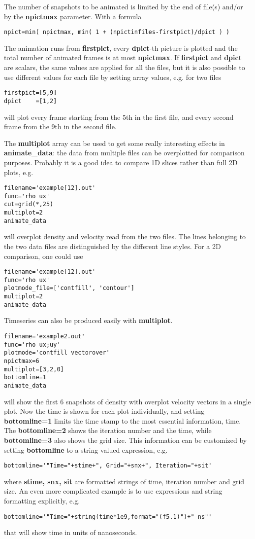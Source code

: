 \documentclass{article}
\begin{document}
   The number of snapshots to be animated is limited by the end of 
   file(s) and/or by the {\bf npictmax} parameter. With a formula
\begin{verbatim}
npict=min( npictmax, min( 1 + (npictinfiles-firstpict)/dpict ) )
\end{verbatim}
   The animation runs from {\bf firstpict}, every {\bf dpict}-th picture is
   plotted and the total number of animated frames is at most {\bf npictmax}. 
   If {\bf firstpict} and {\bf dpict} are scalars, the same values are
   applied for all the files, but it is also possible to use different
   values for each file by setting array values, e.g. for two files
\begin{verbatim}
firstpict=[5,9]
dpict    =[1,2]
\end{verbatim}
   will plot every frame starting from the 5th in the first file,
   and every second frame from the 9th in the second file.

   The {\bf multiplot} array can be used to get some really interesting
   effects in {\bf animate\_data}: 
   the data from multiple files can be overplotted for comparison purposes.
   Probably it is a good idea to compare 1D slices rather than full 2D plots,
   e.g. 
\begin{verbatim}
filename='example[12].out'
func='rho ux'
cut=grid(*,25)
multiplot=2
animate_data
\end{verbatim}
   will overplot density and velocity read from the two files. 
   The lines belonging to the two data files are distinguished by
   the different line styles. For a 2D comparison, one could use
\begin{verbatim}
filename='example[12].out'
func='rho ux'
plotmode_file=['contfill', 'contour']
multiplot=2
animate_data
\end{verbatim}
   Timeseries can also be produced easily with {\bf multiplot}. 
\begin{verbatim}
filename='example2.out'
func='rho ux;uy'
plotmode='contfill vectorover'
npictmax=6
multiplot=[3,2,0]
bottomline=1
animate_data
\end{verbatim}
   will show the first 6 snapshots of density with overplot velocity vectors
   in a single plot. 
   Now the time is shown for each plot individually, and setting
   {\bf bottomline=1} limits the time stamp to the most essential
   information, time. The {\bf bottomline=2} shows the iteration number
   and the time, while {\bf bottomline=3} also shows the grid size.
   This information can be customized by setting {\bf bottomline} to
   a string valued expression, e.g.
\begin{verbatim}
bottomline='"Time="+stime+", Grid="+snx+", Iteration="+sit'
\end{verbatim}
where {\bf stime, snx, sit} are formatted strings of time, iteration number
and grid size. An even more complicated example is to use expressions and
string formatting explicitly, e.g.
\begin{verbatim}
bottomline='"Time="+string(time*1e9,format="(f5.1)")+" ns"'
\end{verbatim}
that will show time in units of nanoseconds.
\end{document}

